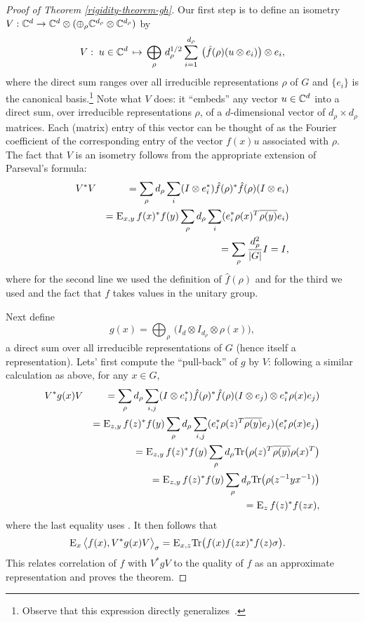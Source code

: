 \begin{proof}[Proof of Theorem \ref{rigidity-theorem-gh}]
Our first step is to define an isometry $V:\mathbb{C}^d \to \mathbb{C}^d \otimes (\oplus_\rho \mathbb{C}^{d_\rho} \otimes \mathbb{C}^{d_\rho})$ by
$$ V :\;u \in \mathbb{C}^d \,\mapsto\, \bigoplus_\rho \,d_\rho^{1/2} \sum_{i=1}^{d_\rho} \,\big(\hat{f}(\rho) (u\otimes e_i)\big) \otimes e_i,$$
where the direct sum ranges over all irreducible representations $\rho$ of $G$ and $\{e_i\}$ is the canonical basis.\footnote{Observe that this expression directly generalizes~.}
Note what $V$ does: it ``embeds'' any vector $u\in \mathbb{C}^d$ into a direct sum, over irreducible representations $\rho$, of a $d$-dimensional vector of $d_\rho\times d_\rho$ matrices. Each (matrix) entry of this vector can be thought of as the Fourier coefficient of the corresponding entry of the vector $f(x)u$ associated with $\rho$. 
The fact that $V$ is an isometry follows from the appropriate extension of Parseval's formula:  
\begin{eqnarray*}
& V^* V &= \sum_\rho d_\rho \sum_i (I\otimes e_i^*) \hat{f}(\rho)^*\hat{f}(\rho) (I\otimes e_i)\\
&&= \textsc{E}_{x,y}\,  f(x)^*f(y) \sum_\rho d_\rho \sum_i  (e_i^* \rho(x)^T \overline{\rho(y)} e_i)\\
&&= \sum_\rho \frac{d_\rho^2}{|G|}I = I,
\end{eqnarray*}
where for the second line we used the definition  of $\hat{f}(\rho)$ and  for the third we used  and the fact that $f$ takes values in the unitary group.

Next define
$$g(x) = \bigoplus_\rho \,\big(I_d \otimes I_{d_\rho} \otimes \rho(x)\big), $$
a direct sum over all irreducible representations of $G$ (hence itself a representation). Lets' first compute the ``pull-back'' of $g$ by $V$: following a similar calculation as above, for any $x\in G$, 
\begin{eqnarray*}
& V^*g(x) V  &=  \sum_{\rho}  d_\rho \sum_{i,j} (I\otimes e_i^*)\hat{f}(\rho)^* \hat{f}(\rho)(I\otimes e_j) \otimes e_i^* \rho(x) e_j ) \\
&& =  \textsc{E}_{z,y}\,  f(z)^*f(y)  \sum_{\rho}  d_\rho \sum_{i,j} (e_i^* \rho(z)^T \overline{\rho(y)} e_j) \big( e_i^* \rho(x) e_j \big) \\
&& =  \textsc{E}_{z,y}\,  f(z)^*f(y)  \sum_{\rho}  d_\rho \mathrm{Tr}\big( \rho(z)^T \overline{\rho(y)}  {\rho(x)^T} \big) \\
&& =  \textsc{E}_{z,y}\,  f(z)^*f(y)  \sum_{\rho}  d_\rho \mathrm{Tr}\big( \rho(z^{-1}y x^{-1}) \big) \\
&& =  \textsc{E}_{z}\,  f(z)^*f(zx) , 
\end{eqnarray*}
where the last equality uses .
It then follows that 
\begin{eqnarray*}
\textsc{E}_{x}\, \big\langle f(x), V^*g(x) V \big\rangle_\sigma &=  \textsc{E}_{x,z} \mathrm{Tr}\big( f(x) f(zx)^* f(z)\sigma\big).
\end{eqnarray*}  
This relates correlation of $f$ with $V^*gV$ to the quality of $f$ as an approximate representation and proves the theorem. 
\end{proof}


